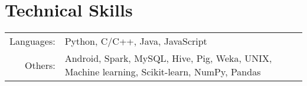 \section{Technical Skills}
\renewcommand{\arraystretch}{1}%
\begin{tabular}{rl}

Languages: &  Python, C/C++, Java, JavaScript  \\
Others: & Android, Spark, MySQL, Hive, Pig, Weka, UNIX, Machine learning, Scikit-learn, NumPy, Pandas \\
\end{tabular}
\vspace{5pt}